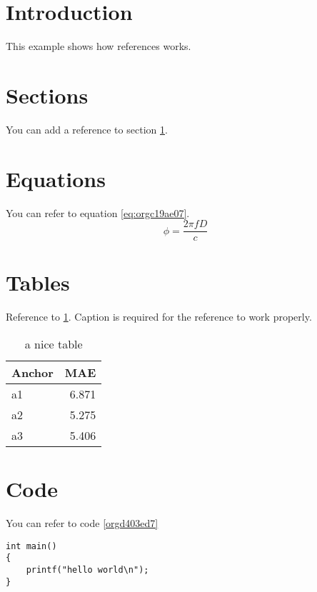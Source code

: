 


\section{Introduction}
\label{sec:org3f58f66}
This example shows how references works.

\section{Sections}
\label{sec:orgd2ea7ab}
You can add a reference to section \ref{sec:org3f58f66}.

\section{Equations}
\label{sec:org12792f0}
You can refer to equation \ref{eq:orgc19ae07}.
\begin{equation}
\label{eq:orgc19ae07}
\phi = \frac{2\pi fD}{c}
\end{equation}

\section{Tables}
\label{sec:orgdee03db}
Reference to \ref{tab:org43a962c}.
Caption is required for the reference to work properly.

\begin{table}[htbp]
\caption{\label{tab:org43a962c}
a nice table}
\centering
\begin{tabular}{lr}
Anchor & MAE\\
\hline
a1 & 6.871\\
a2 & 5.275\\
a3 & 5.406\\
\end{tabular}
\end{table}

\section{Code}
\label{sec:orgc002757}
You can refer to code \ref{orgd403ed7}

\begin{verbatim}
int main()
{
    printf("hello world\n");
}
\end{verbatim}


